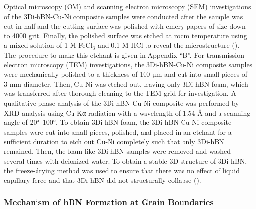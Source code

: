 Optical microscopy (OM) and scanning electron microscopy (SEM) investigations of the 3Di-hBN-Cu-Ni composite samples were conducted after the sample was cut in half and the cutting surface was polished with emery papers of size down to 4000 grit. Finally, the polished surface was etched at room temperature using a mixed solution of 1 M FeC$\text{l}_{3}$ and 0.1 M HCl to reveal the microstructure (\cite{kawk2019simple}). The procedure to make this etchant is given in Appendix “B”. For transmission electron microscopy (TEM) investigations, the 3Di-hBN-Cu-Ni composite samples were mechanically polished to a thickness of 100 µm and cut into small pieces of 3 mm diameter. Then, Cu-Ni was etched out, leaving only 3Di-hBN foam, which was transferred after thorough cleaning to the TEM grid for investigation. A qualitative phase analysis of the 3Di-hBN-Cu-Ni composite was performed by XRD analysis using Cu Kα radiation with a wavelength of 1.54 Å and a scanning angle of 20°–100°.  To obtain 3Di-hBN foam, the 3Di-hBN-Cu-Ni composite samples were cut into small pieces, polished, and placed in an etchant for a sufficient duration to etch out Cu-Ni completely such that only 3Di-hBN remained. Then, the foam-like 3Di-hBN samples were removed and washed several times with deionized water. To obtain a stable 3D structure of 3Di-hBN, the freeze-drying method was used to ensure that there was no effect of liquid capillary force and that 3Di-hBN did not structurally collapse (\cite{ding2017mechanical}). 

\subsubsection{Mechanism of hBN Formation at Grain Boundaries}

